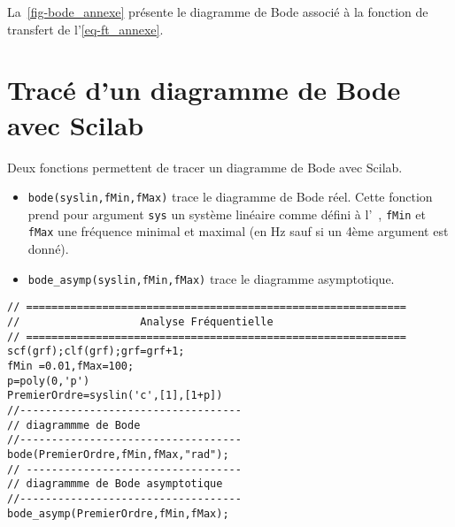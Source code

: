 La~\cref{fig-bode_annexe} présente le diagramme de Bode associé à 
la fonction de transfert de l'\cref{eq-ft_annexe}.

\newpage
\section{Tracé d'un diagramme de Bode avec Scilab}
Deux fonctions permettent de tracer un diagramme de Bode avec Scilab.
\begin{itemize}
        \item  \verb?bode(syslin,fMin,fMax)? trace le diagramme de Bode réel. Cette fonction 
            prend pour argument \verb?sys? un 
            système linéaire comme défini à l'~, 
            \verb?fMin? et \verb?fMax? une fréquence minimal et maximal (en \si{\hertz} 
            sauf si un 4ème argument est donné). 
        \item  \verb?bode_asymp(syslin,fMin,fMax)? trace le diagramme asymptotique.
\end{itemize}


\begin{code}
\begin{verbatim}
// ============================================================
//                   Analyse Fréquentielle                                                                      
// ============================================================
scf(grf);clf(grf);grf=grf+1;
fMin =0.01,fMax=100;
p=poly(0,'p')
PremierOrdre=syslin('c',[1],[1+p])
//-----------------------------------
// diagrammme de Bode
//-----------------------------------
bode(PremierOrdre,fMin,fMax,"rad");
// ----------------------------------
// diagrammme de Bode asymptotique
//-----------------------------------
bode_asymp(PremierOrdre,fMin,fMax);
\end{verbatim}
\end{code}


